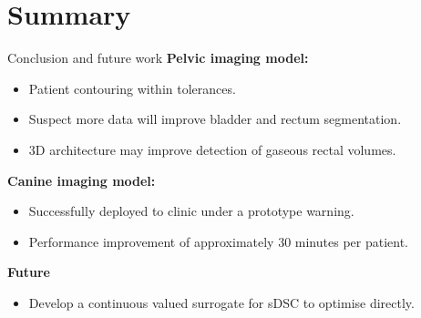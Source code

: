 \documentclass[9pt]{beamer}
\begin{document}
\section{Summary}
\begin{frame}{Conclusion and future work}
\textbf{Pelvic imaging model:}
\begin{itemize}
	\item Patient contouring within tolerances.
	\item Suspect more data will improve bladder and rectum segmentation.
	\item 3D architecture may improve detection of gaseous rectal volumes.

  \end{itemize}
  \vspace{4mm}

 \textbf{Canine imaging model:}
 \begin{itemize}
  \item Successfully deployed to clinic under a prototype warning.
  \item Performance improvement of approximately 30 minutes per patient.
\end{itemize}
\vspace{4mm}

\textbf{Future}
\begin{itemize}
\item Develop a continuous valued surrogate for sDSC to optimise directly.
\end{itemize}
\end{frame}
\end{document}
